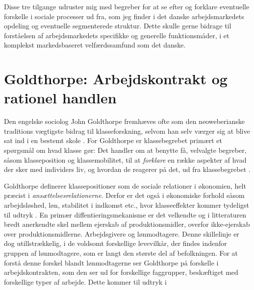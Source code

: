 Disse tre tilgange udruster mig med begreber for at se efter og forklare eventuelle forskelle i sociale processer ud fra, som jeg finder i det danske arbejdsmarkedets opdeling og eventuelle segmenterede struktur. Dette skulle gerne bidrage til forståelsen af arbejdsmarkedets specifikke og generelle funktionsmåder, i et komplekst markedsbaseret velfærdssamfund som det danske. 


\section{Goldthorpe: Arbejdskontrakt og rationel handlen \label{kap_klasse_Goldthorpe}}


Den engelske sociolog John Goldthorpe fremhæves ofte som den neoweberianske traditions vægtigste bidrag til klasseforskning, selvom han selv værger sig at blive sat ind i en bestemt skole \parencite[90]{Harrits2014}. 
For Goldthorpe er klassebegrebet primært et spørgsmål om hvad klasse gør: Det handler om at benytte få, velvalgte begreber, såsom klasseposition og klassemobilitet, til at \emph{forklare} en række aspekter af hvad der sker med individers liv, og hvordan de reagerer på det, ud fra klassebegrebet \parencite[382]{GoldthorpeMarshall1992}. 

Goldthorpe definerer klassepositioner som de sociale relationer i økonomien, helt præcist i \emph{ansættelsesrelationerne}. Derfor er det også i økonomiske forhold såsom arbejdsløshed, løn, stabilitet i indkomst etc., hvor klasseeffekter kommer tydeligst til udtryk \parencite[1]{GoldthorpeMcKnight2004}. En primær diffentieringsmekanisme er det velkendte og i litteraturen bredt anerkendte skel mellem ejerskab af produktionsmidler, overfor ikke-ejerskab over produktionsmidlerne. Arbejdsgivere og lønmodtagere. Denne skillelinje er dog utillstrækkelig, i de voldsomt forskellige levevilkår, der findes indenfor gruppen af lønmodtagere, som er langt den største del af befolkningen. 
For at forstå denne forskel blandt lønmodtagerne ser Goldthorpe på forskelle i arbejdskontrakten, som den ser ud for forskellige faggrupper, beskæftiget med forskellige typer af arbejde. Dette kommer til udtryk i 


